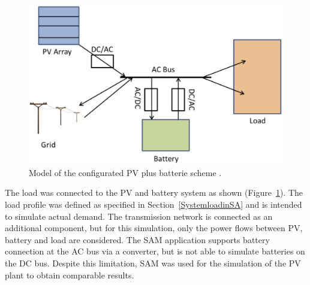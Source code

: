 \begin{figure}[!b]  
\centering
\includegraphics[width=0.6\linewidth]{FIG/PV_model_config}
\caption[Model of the configurated PV plus batterie scheme.]{Model of the configurated PV plus batterie scheme \cite{Diorio2015}.}\label{PV_model_config}
\end{figure}

The load was connected to the PV and battery system as shown (Figure~\ref{PV_model_config}). The load profile was defined as specified in Section~\ref{SystemloadinSA} and is intended to simulate actual demand. The transmission network is connected as an additional component, but for this simulation, only the power flows between PV, battery and load are considered. The SAM application supports battery connection at the AC bus via a converter, but is not able to simulate batteries on the DC bus. Despite this limitation, SAM was used for the simulation of the PV plant to obtain comparable results.


